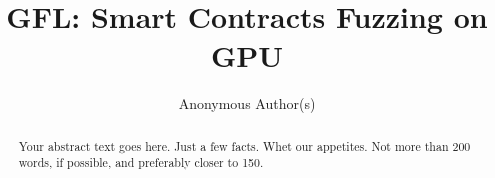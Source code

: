 \documentclass[conference,compsoc]{IEEEtran}
\newcommand{\tool}{\textsc{GFL}}
\begin{document}
\title{\Large \bf {\tool}: Smart Contracts Fuzzing on GPU}

\author{
{\rm Anonymous Author(s)}
} 



\maketitle

\begin{abstract}
Your abstract text goes here. Just a few facts. Whet our appetites.
Not more than 200 words, if possible, and preferably closer to 150.
\end{abstract}


   












\end{document}
